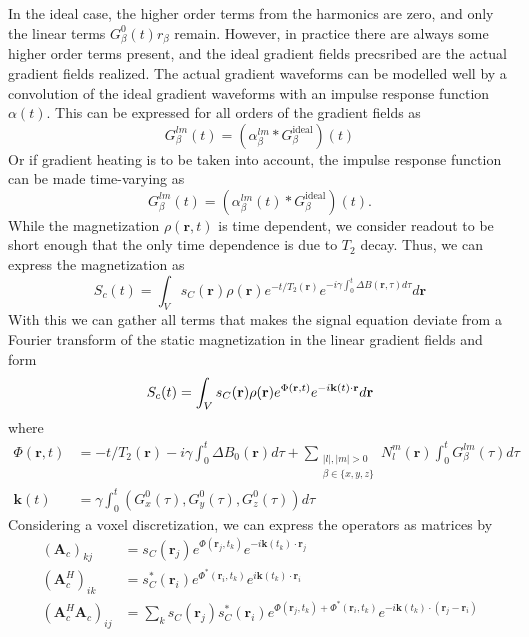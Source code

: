 \documentclass{article}
\begin{document}
In the ideal case, the higher order terms from the harmonics are zero, and only the linear terms $G^0_\beta(t)r_\beta$ remain.
However, in practice there are always some higher order terms present, and the ideal gradient fields precsribed are the actual 
gradient fields realized. The actual gradient waveforms can be modelled well by a convolution of the ideal gradient waveforms 
with an impulse response function $\alpha(t)$. This can be expressed for all orders of the gradient fields as
\begin{equation}
    G^{lm}_\beta(t) = (\alpha^{lm}_\beta * G^{\text{ideal}}_\beta)(t)
\end{equation}
Or if gradient heating is to be taken into account, the impulse response function can be made time-varying as
\begin{equation}
    G^{lm}_\beta(t) = (\alpha^{lm}_\beta(t) * G^{\text{ideal}}_\beta)(t).
\end{equation}
While the magnetization $\rho(\mathbf{r}, t)$ is time dependent, we consider readout to be short enough that the only
time dependence is due to $T_2$ decay. Thus, we can express the magnetization as
\begin{equation}
    S_c(t) = \int_V s_C(\mathbf{r})\rho(\mathbf{r}) e^{-t/T_2(\mathbf{r})} e^{-i\gamma\int_0^t \Delta B(\mathbf{r},\tau) d\tau} d\mathbf{r}
\end{equation}
With this we can gather all terms that makes the signal equation deviate from a Fourier transform of the
static magnetization in the linear gradient fields and form
\begin{equation}
    S_c(t) = \int_V s_C(\mathbf{r})\rho(\mathbf{r})e^{\Phi(\mathbf{r}, t)} e^{-i\mathbf{k}(t)\cdot\mathbf{r}} d\mathbf{r} \\
\end{equation}
where
\begin{align}
    \Phi(\mathbf{r}, t) &= 
        -t/T_2(\mathbf{r}) - i\gamma\int_0^t \Delta B_0(\mathbf{r})d\tau + 
        \sum_{\substack{|l|,|m| > 0 \\ \beta \in \{x,y,z\}}} N^m_l(\mathbf{r}) \int_0^t G^{lm}_\beta(\tau) d\tau
    \\
    \mathbf{k}(t) &= \gamma\int_0^t (G^0_x(\tau), G^0_y(\tau), G^0_z(\tau)) d\tau
\end{align}
Considering a voxel discretization, we can express the operators as matrices by
\begin{align*}
    (\mathbf{A}_c)_{kj} &= s_C(\mathbf{r}_j)e^{\Phi(\mathbf{r}_j, t_k)} e^{-i\mathbf{k}(t_k)\cdot\mathbf{r}_j} \\
    (\mathbf{A}^H_c)_{ik} &= s^*_C(\mathbf{r}_i)e^{\Phi^*(\mathbf{r}_i, t_k)} e^{i\mathbf{k}(t_k)\cdot\mathbf{r}_i} \\
    (\mathbf{A}^H_c\mathbf{A}_c)_{ij} &= \sum_k s_C(\mathbf{r}_j)s^*_C(\mathbf{r}_i)e^{\Phi(\mathbf{r}_j, t_k) + \Phi^*(\mathbf{r}_i, t_k)} e^{-i\mathbf{k}(t_k)\cdot(\mathbf{r}_j - \mathbf{r}_i)}
\end{align*}
\end{document}

